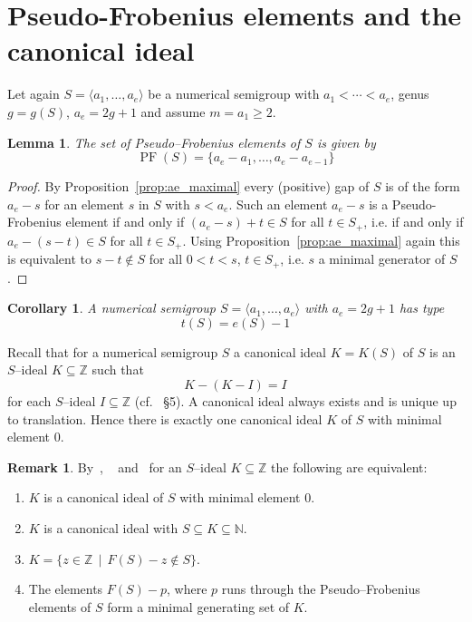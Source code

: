 \documentclass[a4paper,12pt,scrbook]{amsart}
\def \N{\mathbb N}
\def \Z{\mathbb Z}
\theoremstyle{plain}%
\newtheorem{lemma}[satz]{Lemma}
\newtheorem{corollary}[satz]{Corollary}
\theoremstyle{definition}
\newtheorem{rem}[satz]{Remark}
\begin{document}
\section{Pseudo-Frobenius elements and the canonical ideal}\label{sect:PF}

Let again $S = \langle a_1, \ldots, a_e\rangle$ be 
a numerical semigroup with $a_1 < \cdots < a_e$, 
genus $g = g(S)$, $a_e=2g+1$ and assume $m=a_1 \geq 2$.

\begin{lemma}\label{lem:pseudofrob}
The set of Pseudo--Frobenius elements of $S$ is given by 
	\[
	\operatorname{PF}(S) = \{a_e-a_1, \dots, a_e - a_{e-1} \}
	\]
\end{lemma}

\begin{proof}
By Proposition~\ref{prop:ae_maximal} every (positive) gap of $S$ is of the 
form $a_e-s$ for an element $s$ in $S$ with $s < a_e$. Such an element 
$a_e-s$ is a Pseudo-Frobenius element  if and only if  $(a_e-s)+t \in S$ 
for all $t \in S_+$, i.e. if and only if $a_e-(s-t) \in S$ for all $t \in S_+$.  
Using Proposition~\ref{prop:ae_maximal} again this is equivalent to $s-t \notin S$ 
for all $0<t<s$, $t \in S_+$, i.e. $s$ a minimal generator of $S$. 
\end{proof}

\begin{corollary}\label{cor:type_S}
A numerical semigroup $S = \langle a_1, \ldots, a_e\rangle$ with $a_e = 2g+1$ has type 
	$$ t(S) = e(S) - 1 $$
\end{corollary}

Recall that for a numerical semigroup $S$ a canonical ideal $K = K(S)$ of $S$ 
is an $S$--ideal $K \subseteq \Z$ such that  
	$$ K - (K-I) = I $$  
for each $S$--ideal $I\subseteq \Z$ (cf.~\cite{Ja} \S 5). 
A canonical ideal always exists and is unique up to 
translation. Hence there is exactly one canonical ideal $K$ 
of $S$ with minimal element $0$. 

\begin{rem}
By~\cite[\S 5]{Ja}, ~\cite[Prop. 3.2]{Ba} 
and~\cite[ex. 2.14]{RGS} for an $S$--ideal $K \subseteq \Z$ 
the following are equivalent: 
\begin{enumerate}
    \item $K$ is a canonical ideal of $S$ with minimal 
    element $0$.
    \item $K$ is a canonical ideal with $S \subseteq K 
    \subseteq \N$.
    \item $K = \{z\in\mathbb Z\,\mid\,F(S)-z\notin S\} $.
    \item The elements $F(S) - p$, where $p$ runs through 
    the Pseudo--Frobenius elements of $S$ form a minimal 
    generating set of $K$. 
\end{enumerate}
\end{rem}
\end{document}
